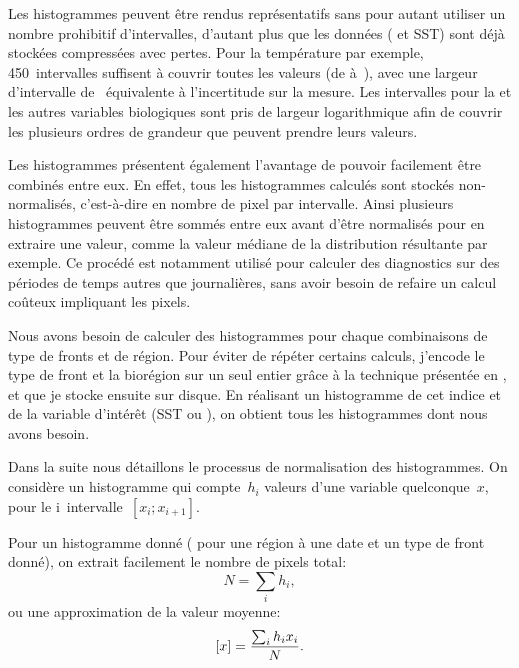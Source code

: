 Les histogrammes peuvent être rendus représentatifs sans pour autant utiliser un nombre prohibitif d'intervalles, d'autant plus que les données ( et SST) sont déjà stockées compressées avec pertes. Pour la température par exemple, 450~intervalles suffisent à couvrir toutes les valeurs (de  à~), avec une largeur d'intervalle de~ équivalente à l'incertitude sur la mesure.
Les intervalles pour la  et les autres variables biologiques sont pris de largeur logarithmique afin de couvrir les plusieurs ordres de grandeur que peuvent prendre leurs valeurs.

Les histogrammes présentent également l'avantage de pouvoir facilement être combinés entre eux.
En effet, tous les histogrammes calculés sont stockés non-normalisés, c'est-à-dire en nombre de pixel par intervalle. Ainsi plusieurs histogrammes peuvent être sommés entre eux avant d'être normalisés pour en extraire une valeur, comme la valeur médiane de la distribution résultante par exemple.
Ce procédé est notamment utilisé pour calculer des diagnostics sur des périodes de temps autres que journalières, sans avoir besoin de refaire un calcul coûteux impliquant les pixels.

\begin{note}[title={Note technique}, label={note:flags-hist}]
  Nous avons besoin de calculer des histogrammes pour chaque combinaisons de type de fronts et de région.
  Pour éviter de répéter certains calculs, j'encode le type de front et la biorégion sur un seul entier grâce à la technique présentée en , et que je stocke ensuite sur disque.
  En réalisant un histogramme  de cet indice et de la variable d'intérêt (SST ou ), on obtient tous les histogrammes dont nous avons besoin.
\end{note}

Dans la suite nous détaillons le processus de normalisation des histogrammes.
On considère un histogramme qui compte~\(h_i\) valeurs d'une variable quelconque~\(x\), pour le i\ieme{}~intervalle~\(\left[x_i; x_{i+1} \right]\).

Pour un histogramme donné ( pour une région à une date et un type de front donné), on extrait facilement le nombre de pixels total:
\begin{equation}
  N = \sum_i h_i,
\end{equation}
ou une approximation de la valeur moyenne:
\begin{equation}
  \left[x\right] = \frac{\sum_i h_i x_i} {N}.
\end{equation}

